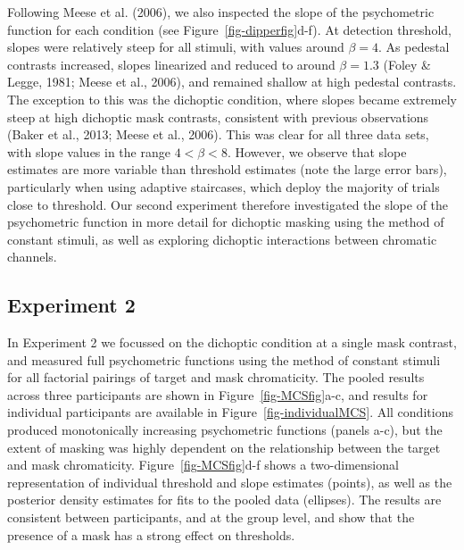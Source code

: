 \documentclass[
  letterpaper,
  DIV=11,
  numbers=noendperiod]{scrartcl}
\begin{document}
Following Meese et al. (2006), we also inspected the slope of the
psychometric function for each condition (see
Figure~\ref{fig-dipperfig}d-f). At detection threshold, slopes were
relatively steep for all stimuli, with values around \(\beta=4\). As
pedestal contrasts increased, slopes linearized and reduced to around
\(\beta=1.3\) (Foley \& Legge, 1981; Meese et al., 2006), and remained
shallow at high pedestal contrasts. The exception to this was the
dichoptic condition, where slopes became extremely steep at high
dichoptic mask contrasts, consistent with previous observations (Baker
et al., 2013; Meese et al., 2006). This was clear for all three data
sets, with slope values in the range \(4 < \beta < 8\). However, we
observe that slope estimates are more variable than threshold estimates
(note the large error bars), particularly when using adaptive
staircases, which deploy the majority of trials close to threshold. Our
second experiment therefore investigated the slope of the psychometric
function in more detail for dichoptic masking using the method of
constant stimuli, as well as exploring dichoptic interactions between
chromatic channels.

\hypertarget{experiment-2}{%
\subsection{Experiment 2}\label{experiment-2}}

In Experiment 2 we focussed on the dichoptic condition at a single mask
contrast, and measured full psychometric functions using the method of
constant stimuli for all factorial pairings of target and mask
chromaticity. The pooled results across three participants are shown in
Figure~\ref{fig-MCSfig}a-c, and results for individual participants are
available in Figure~\ref{fig-individualMCS}. All conditions produced
monotonically increasing psychometric functions (panels a-c), but the
extent of masking was highly dependent on the relationship between the
target and mask chromaticity. Figure~\ref{fig-MCSfig}d-f shows a
two-dimensional representation of individual threshold and slope
estimates (points), as well as the posterior density estimates for fits
to the pooled data (ellipses). The results are consistent between
participants, and at the group level, and show that the presence of a
mask has a strong effect on thresholds.
\end{document}
